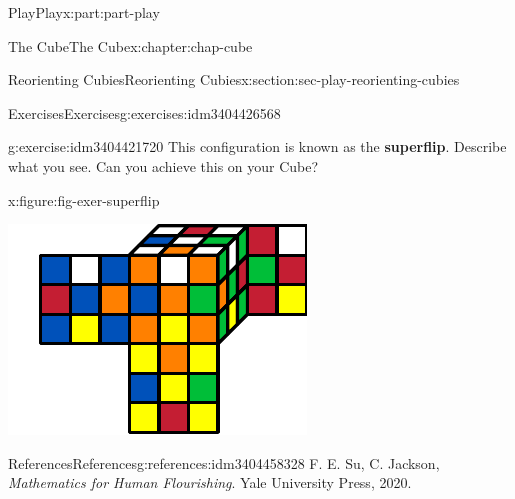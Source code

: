 \documentclass[oneside,10pt,]{book}
\newcommand{\terminology}[1]{\textbf{#1}}
\numberwithin{equation}{section}
\begin{document}
\begin{partptx}{Play}{}{Play}{}{}{x:part:part-play}
\begin{chapterptx}{The Cube}{}{The Cube}{}{}{x:chapter:chap-cube}
\begin{sectionptx}{Reorienting Cubies}{}{Reorienting Cubies}{}{}{x:section:sec-play-reorienting-cubies}
\begin{exercises-subsection-numberless}{Exercises}{}{Exercises}{}{}{g:exercises:idm3404426568}
\begin{divisionexercise}{4}{}{}{g:exercise:idm3404421720}
This configuration is known as the \terminology{superflip}. Describe what you see. Can you achieve this on your Cube?%
\begin{figureptx}{}{x:figure:fig-exer-superflip}{}%
\begin{image}{0.25}{0.5}{0.25}%
\includegraphics[width=\linewidth]{./images/superflip.pdf}
\end{image}%
\tcblower
\end{figureptx}%
\end{divisionexercise}%
\end{exercises-subsection-numberless}
\end{sectionptx}
%
%
\typeout{************************************************}
\typeout{************************************************}
%
\begin{references-section}{References}{}{References}{}{}{g:references:idm3404458328}
F. E. Su, C. Jackson, \emph{Mathematics for Human Flourishing}. Yale University Press, 2020.\end{references-section}
\end{chapterptx}
 \end{partptx}
%
%
\typeout{************************************************}
\typeout{************************************************}
%
\end{document}
